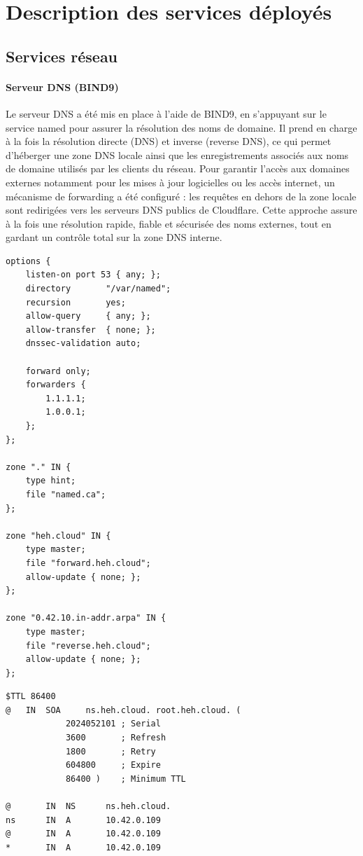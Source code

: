\documentclass[a4paper,12pt]{article}
\begin{document}
\clearpage
\section{Description des services déployés}

\subsection{Services réseau}

\paragraph{Serveur DNS (BIND9)}

Le serveur DNS a été mis en place à l'aide de BIND9, en s'appuyant sur le service named pour assurer la résolution des noms de domaine. Il prend en charge à la fois la résolution directe (DNS) et inverse (reverse DNS), ce qui permet d'héberger une zone DNS locale ainsi que les enregistrements associés aux noms de domaine utilisés par les clients du réseau. Pour garantir l'accès aux domaines externes  notamment pour les mises à jour logicielles ou les accès internet, un mécanisme de forwarding a été configuré : les requêtes en dehors de la zone locale sont redirigées vers les serveurs DNS publics de Cloudflare. Cette approche assure à la fois une résolution rapide, fiable et sécurisée des noms externes, tout en gardant un contrôle total sur la zone DNS interne.

\begin{lstlisting}[caption={Configuration DNS BIND9 – /etc/named.conf}]
options {
    listen-on port 53 { any; };
    directory       "/var/named";
    recursion       yes;
    allow-query     { any; };
    allow-transfer  { none; };
    dnssec-validation auto;

    forward only;
    forwarders {
        1.1.1.1;
        1.0.0.1;
    };
};

zone "." IN {
    type hint;
    file "named.ca";
};

zone "heh.cloud" IN {
    type master;
    file "forward.heh.cloud";
    allow-update { none; };
};

zone "0.42.10.in-addr.arpa" IN {
    type master;
    file "reverse.heh.cloud";
    allow-update { none; };
};
\end{lstlisting}

\begin{lstlisting}[caption={Configuration DNS BIND9 – /var/named/forward.heh.cloud}]
$TTL 86400
@   IN  SOA     ns.heh.cloud. root.heh.cloud. (
            2024052101 ; Serial
            3600       ; Refresh
            1800       ; Retry
            604800     ; Expire
            86400 )    ; Minimum TTL

@       IN  NS      ns.heh.cloud.
ns      IN  A       10.42.0.109
@       IN  A       10.42.0.109
*       IN  A       10.42.0.109
\end{lstlisting}
\end{document}
